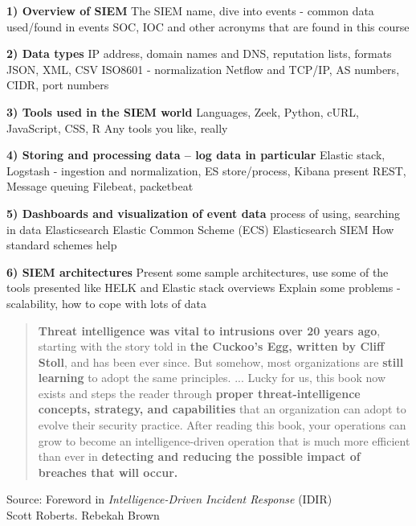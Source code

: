\documentclass[Screen16to9,17pt]{foils}
\begin{document}

\begin{list2}
\item {\bf 1) Overview of SIEM}
The SIEM name, dive into events - common data used/found in events SOC, IOC and other acronyms that are found in this course

\item {\bf 2) Data types}
IP address, domain names and DNS, reputation lists, formats JSON, XML, CSV ISO8601 - normalization Netflow and TCP/IP, AS numbers, CIDR, port numbers

\item {\bf 3) Tools used in the SIEM world}
Languages, Zeek, Python, cURL, JavaScript, CSS, R Any tools you like, really

\item {\bf 4) Storing and processing data -- log data in particular}
Elastic stack, Logstash - ingestion and normalization, ES store/process, Kibana present REST, Message queuing Filebeat, packetbeat

\item {\bf 5) Dashboards and visualization of event data}
process of using, searching in data Elasticsearch Elastic Common Scheme (ECS) Elasticsearch SIEM How standard schemes help

\item {\bf 6) SIEM architectures}
Present some sample architectures, use some of the tools presented like HELK and Elastic stack overviews
Explain some problems - scalability, how to cope with lots of data
\end{list2}




\begin{quote}
{\bf Threat intelligence was vital to intrusions over 20 years ago}, starting with the story told in {\bf the Cuckoo’s Egg, written by Cliff Stoll}, and has been ever since. But somehow, most organizations are {\bf still learning} to adopt the same principles. ... Lucky for us, this book now exists and steps the reader through {\bf proper threat-intelligence concepts, strategy, and capabilities} that an organization can adopt to evolve their security practice. After reading this book, your operations can grow to become an intelligence-driven operation that is much more efficient than ever in {\bf detecting and reducing the possible impact of breaches that will occur.}
\end{quote}
Source: Foreword in \emph{Intelligence-Driven Incident Response} (IDIR)\\
 Scott Roberts. Rebekah Brown
\end{document}
